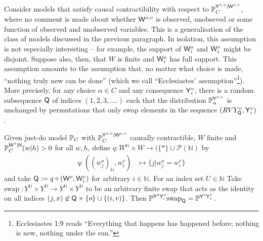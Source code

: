Consider models that satisfy causal contractibility with respect to $\mathbb{P}_C^{\mathsf{Y}^{o,v}|\mathsf{W}^{o,v}}$, where no comment is made about whether $\mathsf{W}^{o,v}$ is observed, unobseved or some function of observed and unobserved variables. This is a generalisation of the class of models discussed in the previous paragraph.  In isolation, this assumption is not especially interesting -- for example, the support of $\mathsf{W}^{o}_i$ and $\mathsf{W}^v_i$ might be disjoint. Suppose also, then, that $W$ is finite and $\mathsf{W}^o_i$ has full support. This assumption amounts to the assumption that, no matter what choice is made, ``nothing truly new can be done'' (which we call ``Ecclesiastes' assumption''\footnote{Ecclesiastes 1:9 reads ``Everything that happens has happened before; nothing is new, nothing under the sun.''\citep{noauthor_holy_1995}}). More precisely, for any choice $\alpha\in C$ and any consequence $\mathsf{Y}_i^v$, there is a random subsequence $\mathsf{Q}$ of indices $(1,2,3,....)$ such that the distribution $\mathbb{P}_\alpha^{\mathsf{Y}^{o,v}}$ is unchanged by permutations that only swap elements in the sequence $(RV{Y}^o_{\mathsf{Q}},\mathsf{Y}^v_i)$.

\begin{theorem}\label{th:condit_exchange}
Given just-do model $\mathbb{P}_C$ with $\mathbb{P}_C^{\mathsf{Y}^{o,v}|\mathsf{W}^{o,v}}$ causally contractible, $W$ finite and $\mathbb{P}_C^{\mathsf{W}^o|\mathsf{H}}(w|h)>0$ for all $w,h$, define $q:W^{\mathbb{N}}\times W\to (\{*\}\cup \mathscr{P}(\mathbb{N})$ by 
\begin{align}
    q:((w^o_j)_{\mathbb{N}},w^v_i)&\mapsto \{j|w^o_j=w^v_i\}
\end{align}
and take $\mathsf{Q}:=q\circ(\mathsf{W}^o,\mathsf{W}^v_i)$ for arbitrary $i\in \mathbb{N}$. For an index set $U\in\mathbb{N}$ Take $\text{swap}_{\cdot}:Y^{\mathbb{N}}\times Y^{\mathbb{N}}\to Y^{\mathbb{N}}\times Y^{\mathbb{N}}$ to be an arbitrary finite swap that acts as the identity on all indices $(j,x)\not\in \mathsf{Q}\times \{o\}\cup\{(i,v)\}$. Then $\mathbb{P}^{\mathsf{Y}^{o}\mathsf{Y}^v_i}\text{swap}_{\mathsf{Q}} = \mathbb{P}^{\mathsf{Y}^{o}\mathsf{Y}^v_i}$.
\end{theorem}

